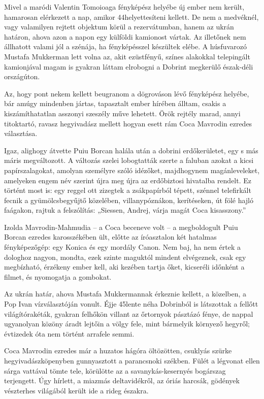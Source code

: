 \documentclass{IEEEtran}
\begin{document}
Mivel a maródi Valentin Tomoioaga fényképész helyébe új ember nem került,
hamarosan elérkezett a nap, amikor 44helyettesíteni kellett. De nem a
medvéknél, vagy valamilyen rejtett objektum körül a rezervátumban, hanem az
ukrán határon, ahova azon a napon egy külföldi kamionost vártak. Az illetőnek
nem állhatott valami jól a szénája, ha fényképésszel készültek elébe. A
húsfuvarozó Mustafa Mukkerman lett volna az, akit ezüstfényű, színes alakokkal
telepingált kamionjával magam is gyakran láttam elrobogni a Dobrint megkerülő
észak-déli országúton.

Az, hogy pont nekem kellett beugranom a dögrováson lévő fényképész helyébe,
bár amúgy mindenben jártas, tapasztalt ember hírében álltam, csakis a
kiszámíthatatlan asszonyi szeszély műve lehetett. Örök rejtély marad, annyi
titoktartó, ravasz hegyivadász mellett hogyan esett rám Coca Mavrodin ezredes
választása.

Igaz, alighogy átvette Puiu Borcan halála után a dobrini erdőkerületet, egy s
más máris megváltozott. A változás szelei lobogtatták szerte a faluban azokat
a kicsi papírszalagokat, amolyan személyre szóló idézőket, majdhogynem
magánleveleket, amelyeken engem név szerint újra meg újra az erdőbiztosi
hivatalba rendelt. Ez történt most is: egy reggel ott zizegtek a zsákpapírból
tépett, szénnel telefirkált fecnik a gyümölcsbegyűjtő közelében,
villanypóznákon, kerítéseken, út fölé hajló faágakon, rajtuk a felszólítás:
„Siessen, Andrej, várja magát Coca kisasszony.”

Izolda Mavrodin-Mahmudia – a Coca beceneve volt – a megboldogult Puiu Borcan
ezredes karosszékében ült, előtte az íróasztalon két hatalmas fényképezőgép:
egy Konica és egy mordály Canon. Nem baj, ha nem értek a dologhoz nagyon,
mondta, ezek szinte maguktól mindent elvégeznek, csak egy megbízható, érzékeny
ember kell, aki kezében tartja őket, kicseréli időnként a filmet, és
nyomogatja a gombokat.

Az ukrán határ, ahova Mustafa Mukkermannak érkeznie kellett, a közelben, a Pop
Ivan vízválasztóján vonult. Éjje 45lente néha Dobrinból is látszottak a
fellőtt világítórakéták, gyakran felhőkön villant az őrtornyok pásztázó fénye,
de nappal ugyanolyan közöny áradt lejtőin a völgy fele, mint bármelyik
környező hegyről; évtizedek óta nem történt arrafele semmi.

Coca Mavrodin ezredes már a huzatos hágóra öltözötten, csuklyás szürke
hegyivadászköpenyben gunnyasztott a parancsnoki székben. Fülét a légvonat
ellen sárga vattával tömte tele, körülötte az a savanykás-kesernyés bogárszag
terjengett. Úgy hírlett, a miazmás deltavidékről, az óriás harcsák, gödények
vészterhes világából került ide a rideg északra.
\end{document}
